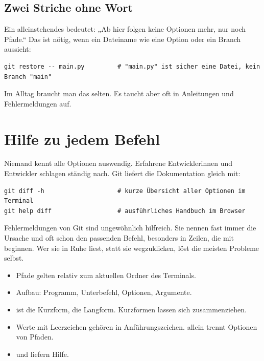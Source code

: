 \subsection*{Zwei Striche ohne Wort}

Ein alleinstehendes \cmd{--} bedeutet: „Ab hier folgen keine Optionen mehr, nur noch Pfade.“
Das ist nötig, wenn ein Dateiname wie eine Option oder ein Branch aussieht:

\begin{lstlisting}[style=befehle]
git restore -- main.py         # "main.py" ist sicher eine Datei, kein Branch "main"
\end{lstlisting}

Im Alltag braucht man das selten. Es taucht aber oft in Anleitungen und Fehlermeldungen auf.

\section{Hilfe zu jedem Befehl}

Niemand kennt alle Optionen auswendig. Erfahrene Entwicklerinnen und Entwickler schlagen
ständig nach. Git liefert die Dokumentation gleich mit:

\begin{lstlisting}[style=befehle]
git diff -h                    # kurze Übersicht aller Optionen im Terminal
git help diff                  # ausführliches Handbuch im Browser
\end{lstlisting}

\begin{erfahrung}
Fehlermeldungen von Git sind ungewöhnlich hilfreich. Sie nennen fast immer die Ursache und
oft schon den passenden Befehl, besonders in Zeilen, die mit  beginnen. Wer sie
in Ruhe liest, statt sie wegzuklicken, löst die meisten Probleme selbst.
\end{erfahrung}

\begin{zusammenfassung}
\begin{itemize}[nosep]
  \item Pfade gelten relativ zum aktuellen Ordner des Terminals.
  \item Aufbau: Programm, Unterbefehl, Optionen, Argumente.
  \item {} ist die Kurzform,  die Langform. Kurzformen lassen sich zusammenziehen.
  \item Werte mit Leerzeichen gehören in Anführungszeichen. \cmd{--} allein trennt Optionen von Pfaden.
  \item {} und  liefern Hilfe.
\end{itemize}
\end{zusammenfassung}
